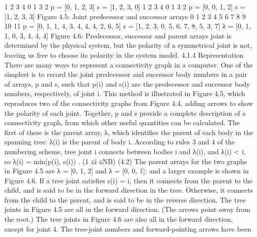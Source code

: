 1 2 3 4 0 1 3 2 p = [0, 1, 2, 3] s = [1, 2, 3, 0] 1 2 3 4 0 1 3 2 p = [0, 0, 1, 2] s = [1, 2, 3, 3] Figure 4.5: Joint predecessor and successor arrays 0 1 2 3 4 5 6 7 8 9 10 11 p = [0, 1, 1, 4, 3, 4, 4, 4, 2, 6, 5] s = [1, 2, 3, 0, 5, 6, 7, 8, 5, 3, 7] λ = [0, 1, 1, 0, 3, 4, 4, 4] Figure 4.6: Predecessor, successor and parent arrays joint is determined by the physical system, but the polarity of a symmetrical joint is not, leaving us free to choose its polarity in the system model. 4.1.4 Representation There are many ways to represent a connectivity graph in a computer. One of the simplest is to record the joint predecessor and successor body numbers in a pair of arrays, p and s, such that p(i) and s(i) are the predecessor and successor body numbers, respectively, of joint i. This method is illustrated in Figure 4.5, which reproduces two of the connectivity graphs from Figure 4.4, adding arrows to show the polarity of each joint. Together, p and s provide a complete description of a connectivity graph, from which other useful quantities can be calculated. The first of these is the parent array, λ, which identifies the parent of each body in the spanning tree: λ(i) is the parent of body i. According to rules 3 and 4 of the numbering scheme, tree joint i connects between bodies i and λ(i), and λ(i) < i, so λ(i) = min(p(i), s(i)) . (1 ≤i ≤NB) (4.2) The parent arrays for the two graphs in Figure 4.5 are λ = [0, 1, 2] and λ = [0, 0, 1]; and a larger example is shown in Figure 4.6. If a tree joint satisfies s(i) = i, then it connects from the parent to the child, and is said to be in the forward direction in the tree. Otherwise, it connects from the child to the parent, and is said to be in the reverse direction. The tree joints in Figure 4.5 are all in the forward direction. (The arrows point away from the root.) The tree joints in Figure 4.6 are also all in the forward direction, except for joint 4. The tree-joint numbers and forward-pointing arrows have been

